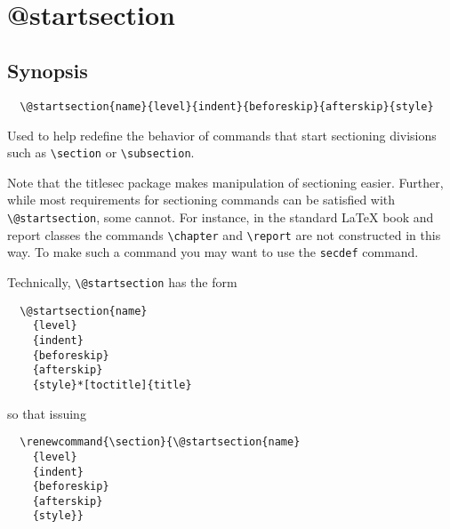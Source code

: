  

\section{\\\\@startsection}

\subsection{Synopsis}

\begin{verbatim}
  \@startsection{name}{level}{indent}{beforeskip}{afterskip}{style}
\end{verbatim}

Used to help redefine the behavior of commands that start sectioning divisions such as \verb|\section| 
or \verb|\subsection|.

Note that the titlesec package makes manipulation of sectioning easier.
Further, while most requirements for sectioning commands can be satisfied with
\verb|\@startsection|, some cannot. For instance, in the standard LaTeX book and
report classes the commands \verb|\chapter| and \verb|\report| are not constructed in this
way. To make such a command you may want to use the \verb|secdef| command.

Technically, \verb|\@startsection| has the form

\begin{verbatim}
  \@startsection{name}
    {level}
    {indent}
    {beforeskip}
    {afterskip}
    {style}*[toctitle]{title}
\end{verbatim}

so that issuing

\begin{verbatim}
  \renewcommand{\section}{\@startsection{name}
    {level}
    {indent}
    {beforeskip}
    {afterskip}
    {style}}
\end{verbatim}

